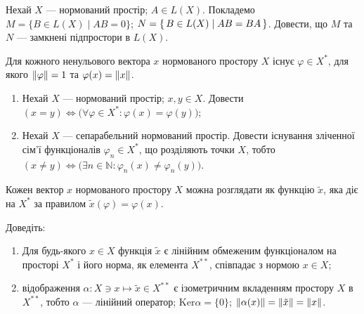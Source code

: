 \begin{exercise}
    Нехай $X$ --- нормований простір; $A \in L(X)$. Покладемо $M = \{B \in L(X) \;|\; AB=0\}$;
    $N = \set{B \in L(X) \mid AB=BA}$. Довести, що $M$ та $N$ --- замкнені підпростори в $L(X)$.
\end{exercise}

\begin{theory}
    \begin{theorem*}
        Для кожного ненульового вектора $x$ нормованого простору $X$ існує $\varphi \in X^*$,
        для якого $\left\lVert\varphi\right\rVert = 1$ та $\varphi(x) = \left\lVert x\right\rVert$. 
    \end{theorem*}
\end{theory}

\begin{exercise} 
    \begin{enumerate}[label=\ukr*)]
        \item Нехай $X$ --- нормований простір; $x,y \in X$. Довести $(x=y) \Leftrightarrow 
        \big(\forall\varphi \in X^*: \varphi(x) = \varphi(y)\big)$;
        \item Нехай $X$ --- сепарабельний нормований простір. Довести існування зліченної сім'ї
        функціоналів $\varphi_n \in X^*$, що розділяють точки $X$, тобто 
        $(x\neq y) \Leftrightarrow \big(\exists n \in \mathbb{N}: \varphi_n(x) \neq \varphi_n(y)\big)$.
    \end{enumerate}
\end{exercise}

\begin{theory}
    Кожен вектор $x$ нормованого простору $X$ можна розглядати як функцію $\tilde{x}$, яка 
    діє на $X^*$ за правилом $\tilde{x}(\varphi)=\varphi(x)$.
\end{theory}

\begin{exercise}\label{N:1_1_42}
    Доведіть:~
    \begin{enumerate}[label=\ukr*)]
        \item Для будь-якого $x \in X$ функція $\tilde{x}$ є лінійним обмеженим функціоналом на просторі $X^*$
        і його норма, як елемента $X^{**}$, співпадає з нормою $x \in X$;
        \item відображення $\alpha: X \ni x \mapsto \tilde{x} \in X^{**}$ є ізометричним вкладенням
        простору $X$ в $X^{**}$, тобто $\alpha$ --- лінійний оператор; $\mathrm{Ker}\alpha = \{0\}$; 
        $\left\lVert\alpha(x)\right\rVert = \left\lVert\tilde{x}\right\rVert = \left\lVert x\right\rVert$.
    \end{enumerate}
\end{exercise}

